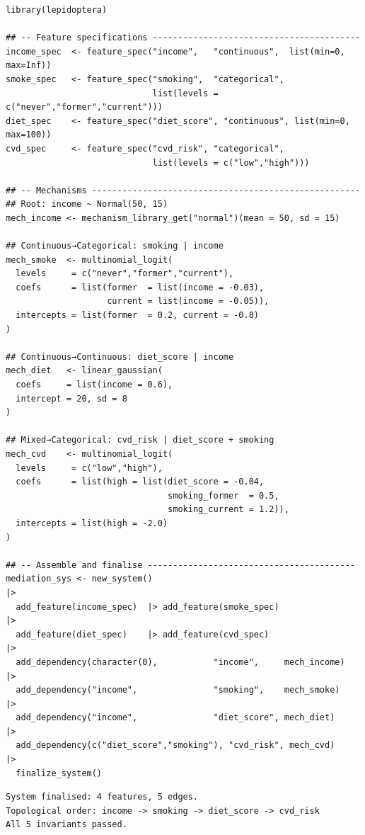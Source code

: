 \documentclass[article]{jss}
\begin{document}
\begin{tcolorbox}[codebox, title={\small\textbf{R} code}]
\begin{verbatim}
library(lepidoptera)

## -- Feature specifications -----------------------------------------
income_spec  <- feature_spec("income",   "continuous",  list(min=0, max=Inf))
smoke_spec   <- feature_spec("smoking",  "categorical",
                             list(levels = c("never","former","current")))
diet_spec    <- feature_spec("diet_score", "continuous", list(min=0, max=100))
cvd_spec     <- feature_spec("cvd_risk", "categorical",
                             list(levels = c("low","high")))

## -- Mechanisms -----------------------------------------------------
## Root: income ~ Normal(50, 15)
mech_income <- mechanism_library_get("normal")(mean = 50, sd = 15)

## Continuous→Categorical: smoking | income
mech_smoke  <- multinomial_logit(
  levels     = c("never","former","current"),
  coefs      = list(former  = list(income = -0.03),
                    current = list(income = -0.05)),
  intercepts = list(former  = 0.2, current = -0.8)
)

## Continuous→Continuous: diet_score | income
mech_diet   <- linear_gaussian(
  coefs     = list(income = 0.6),
  intercept = 20, sd = 8
)

## Mixed→Categorical: cvd_risk | diet_score + smoking
mech_cvd    <- multinomial_logit(
  levels     = c("low","high"),
  coefs      = list(high = list(diet_score = -0.04,
                                smoking_former  = 0.5,
                                smoking_current = 1.2)),
  intercepts = list(high = -2.0)
)

## -- Assemble and finalise -----------------------------------------
mediation_sys <- new_system()                                         |>
  add_feature(income_spec)  |> add_feature(smoke_spec)               |>
  add_feature(diet_spec)    |> add_feature(cvd_spec)                  |>
  add_dependency(character(0),           "income",     mech_income)  |>
  add_dependency("income",               "smoking",    mech_smoke)   |>
  add_dependency("income",               "diet_score", mech_diet)    |>
  add_dependency(c("diet_score","smoking"), "cvd_risk", mech_cvd)    |>
  finalize_system()
\end{verbatim}
\end{tcolorbox}

\begin{tcolorbox}[outputbox, title={\small Output}]
\begin{verbatim}
System finalised: 4 features, 5 edges.
Topological order: income -> smoking -> diet_score -> cvd_risk
All 5 invariants passed.
\end{verbatim}
\end{tcolorbox}
\end{document}
